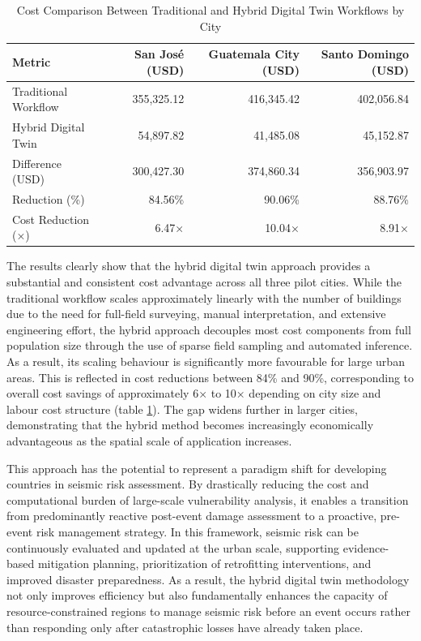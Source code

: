 \begin{table}[htbp]
\centering
\caption{Cost Comparison Between Traditional and Hybrid Digital Twin Workflows by City}
\begin{tabular}{lrrr}
\hline
\textbf{Metric} & \textbf{San José (USD)} & \textbf{Guatemala City (USD)} & \textbf{Santo Domingo (USD)} \\
\hline
Traditional Workflow & 355,325.12 & 416,345.42 & 402,056.84 \\
Hybrid Digital Twin & 54,897.82 & 41,485.08 & 45,152.87 \\
Difference (USD) & 300,427.30 & 374,860.34 & 356,903.97 \\
Reduction (\%) & 84.56\% & 90.06\% & 88.76\% \\
Cost Reduction (×) & 6.47× & 10.04× & 8.91× \\
\hline
\end{tabular}
\label{tab:cost_comparison_by_city}
\end{table}

The results clearly show that the hybrid digital twin approach provides a substantial and consistent cost advantage across all three pilot cities. While the traditional workflow scales approximately linearly with the number of buildings due to the need for full-field surveying, manual interpretation, and extensive engineering effort, the hybrid approach decouples most cost components from full population size through the use of sparse field sampling and automated inference. As a result, its scaling behaviour is significantly more favourable for large urban areas. This is reflected in cost reductions between 84\% and 90\%, corresponding to overall cost savings of approximately 6× to 10× depending on city size and labour cost structure (table \ref{tab:cost_comparison_by_city}). The gap widens further in larger cities, demonstrating that the hybrid method becomes increasingly economically advantageous as the spatial scale of application increases.

This approach has the potential to represent a paradigm shift for developing countries in seismic risk assessment. By drastically reducing the cost and computational burden of large-scale vulnerability analysis, it enables a transition from predominantly reactive post-event damage assessment to a proactive, pre-event risk management strategy. In this framework, seismic risk can be continuously evaluated and updated at the urban scale, supporting evidence-based mitigation planning, prioritization of retrofitting interventions, and improved disaster preparedness. As a result, the hybrid digital twin methodology not only improves efficiency but also fundamentally enhances the capacity of resource-constrained regions to manage seismic risk before an event occurs rather than responding only after catastrophic losses have already taken place.


